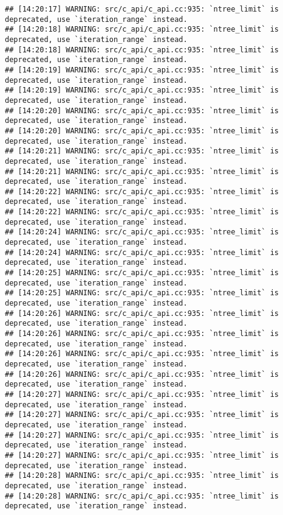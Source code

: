 \documentclass[
]{article}
\begin{document}
\begin{verbatim}
## [14:20:17] WARNING: src/c_api/c_api.cc:935: `ntree_limit` is deprecated, use `iteration_range` instead.
## [14:20:18] WARNING: src/c_api/c_api.cc:935: `ntree_limit` is deprecated, use `iteration_range` instead.
## [14:20:18] WARNING: src/c_api/c_api.cc:935: `ntree_limit` is deprecated, use `iteration_range` instead.
## [14:20:19] WARNING: src/c_api/c_api.cc:935: `ntree_limit` is deprecated, use `iteration_range` instead.
## [14:20:19] WARNING: src/c_api/c_api.cc:935: `ntree_limit` is deprecated, use `iteration_range` instead.
## [14:20:20] WARNING: src/c_api/c_api.cc:935: `ntree_limit` is deprecated, use `iteration_range` instead.
## [14:20:20] WARNING: src/c_api/c_api.cc:935: `ntree_limit` is deprecated, use `iteration_range` instead.
## [14:20:21] WARNING: src/c_api/c_api.cc:935: `ntree_limit` is deprecated, use `iteration_range` instead.
## [14:20:21] WARNING: src/c_api/c_api.cc:935: `ntree_limit` is deprecated, use `iteration_range` instead.
## [14:20:22] WARNING: src/c_api/c_api.cc:935: `ntree_limit` is deprecated, use `iteration_range` instead.
## [14:20:22] WARNING: src/c_api/c_api.cc:935: `ntree_limit` is deprecated, use `iteration_range` instead.
## [14:20:24] WARNING: src/c_api/c_api.cc:935: `ntree_limit` is deprecated, use `iteration_range` instead.
## [14:20:24] WARNING: src/c_api/c_api.cc:935: `ntree_limit` is deprecated, use `iteration_range` instead.
## [14:20:25] WARNING: src/c_api/c_api.cc:935: `ntree_limit` is deprecated, use `iteration_range` instead.
## [14:20:25] WARNING: src/c_api/c_api.cc:935: `ntree_limit` is deprecated, use `iteration_range` instead.
## [14:20:26] WARNING: src/c_api/c_api.cc:935: `ntree_limit` is deprecated, use `iteration_range` instead.
## [14:20:26] WARNING: src/c_api/c_api.cc:935: `ntree_limit` is deprecated, use `iteration_range` instead.
## [14:20:26] WARNING: src/c_api/c_api.cc:935: `ntree_limit` is deprecated, use `iteration_range` instead.
## [14:20:26] WARNING: src/c_api/c_api.cc:935: `ntree_limit` is deprecated, use `iteration_range` instead.
## [14:20:27] WARNING: src/c_api/c_api.cc:935: `ntree_limit` is deprecated, use `iteration_range` instead.
## [14:20:27] WARNING: src/c_api/c_api.cc:935: `ntree_limit` is deprecated, use `iteration_range` instead.
## [14:20:27] WARNING: src/c_api/c_api.cc:935: `ntree_limit` is deprecated, use `iteration_range` instead.
## [14:20:27] WARNING: src/c_api/c_api.cc:935: `ntree_limit` is deprecated, use `iteration_range` instead.
## [14:20:28] WARNING: src/c_api/c_api.cc:935: `ntree_limit` is deprecated, use `iteration_range` instead.
## [14:20:28] WARNING: src/c_api/c_api.cc:935: `ntree_limit` is deprecated, use `iteration_range` instead.

\end{verbatim}
\end{document}
